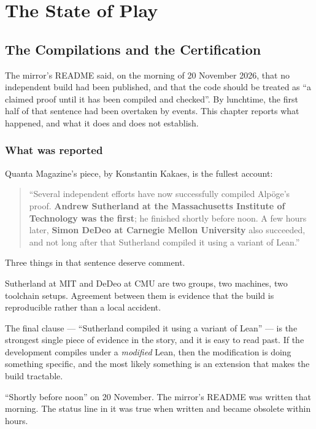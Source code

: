 
\part{The State of Play}
\label{part:play}

\chapter{The Compilations and the Certification}
\label{ch:compilations}

The mirror's README said, on the morning of 20 November 2026, that no
independent build had been published, and that the code should be treated as
``a claimed proof until it has been compiled and checked''. By lunchtime, the
first half of that sentence had been overtaken by events. This chapter
reports what happened, and what it does and does not establish.

\section{What was reported}Quanta Magazine's piece, by Konstantin Kakaes, is the fullest account:

\begin{quote}
\small
``Several independent efforts have now successfully compiled Alpöge's proof.
\textbf{Andrew Sutherland at the Massachusetts Institute of Technology was the
first}; he finished shortly before noon. A few hours later, \textbf{Simon DeDeo
at Carnegie Mellon University} also succeeded, and not long after that
Sutherland compiled it using a variant of Lean.''
\end{quote}

Three things in that sentence deserve comment.

\begin{description}[style=nextline,leftmargin=0pt,labelwidth=0pt,labelsep=0pt,font=\sffamily\bfseries\small,
  itemsep=5pt]
\item[\textbf{Two independent compilers.}] Sutherland at MIT and DeDeo at CMU
are two groups, two machines, two toolchain setups. Agreement between them is
evidence that the build is reproducible rather than a local accident.
\item[\textbf{A variant of Lean.}] The final clause --- ``Sutherland compiled
it using a variant of Lean'' --- is the strongest single piece of evidence in
the story, and it is easy to read past. If the development compiles under a
\emph{modified} Lean, then the modification is doing something specific, and
the most likely something is an extension that makes the build tractable.
\item[\textbf{The order of events.}] ``Shortly before noon'' on 20 November.
The mirror's README was written that morning. The status line in it was true
when written and became obsolete within hours.
\end{description}

